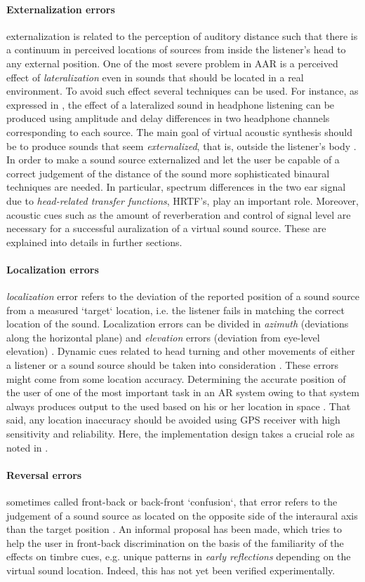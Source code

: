 \documentclass[journal]{IEEEtran}
\begin{document}
\paragraph{Externalization errors}
externalization is related to the perception of auditory distance such that there is a continuum in perceived locations of sources from inside the listener's head to any external position. One of the most severe problem in AAR is a perceived effect of \emph{lateralization} even in sounds that should be located in a real environment. To avoid such effect several techniques can be used. For instance, as expressed in \cite{}, the effect of a lateralized sound in headphone listening can be produced using amplitude and delay differences in two headphone channels corresponding to each source. The main goal of virtual acoustic synthesis should be to produce sounds that seem \emph{externalized}, that is, outside the listener's body \cite{}. In order to make a sound source externalized and let the user be capable of a correct judgement of the distance of the sound more sophisticated binaural techniques are needed. In particular, spectrum differences in the two ear signal due to \emph{head-related transfer functions}, HRTF's, play an important role. Moreover, acoustic cues such as the amount of reverberation and control of signal level are necessary for a successful auralization of a virtual sound source. These are explained into details in further sections.
\paragraph{Localization errors}
\emph{localization} error refers to the deviation of the reported position of a sound source from a measured `target` location, i.e. the listener fails in matching the correct location of the sound. Localization errors can be divided in \emph{azimuth} (deviations along the horizontal plane) and \emph{elevation} errors (deviation from eye-level elevation) \cite{}. Dynamic cues related to head turning and other movements of either a listener or a sound source should be taken into consideration \cite{}. These errors might come from some location accuracy. Determining the accurate position of the user of one of the most important task in an AR system owing to that system always produces output to the used based on his or her location in space \cite{}. That said, any location inaccuracy should be avoided using GPS receiver with high sensitivity and reliability. Here, the implementation design takes a crucial role as noted in \cite{}.
\paragraph{Reversal errors}
sometimes called front-back or back-front `confusion`, that error refers to the judgement of a sound source as located on the opposite side of the interaural axis than the target position \cite{}. An informal proposal has been made, which tries to help the user in front-back discrimination on the basis of the familiarity of the effects on timbre cues, e.g. unique patterns in \emph{early reflections} depending on the virtual sound location. Indeed, this has not yet been verified experimentally.
\end{document}
